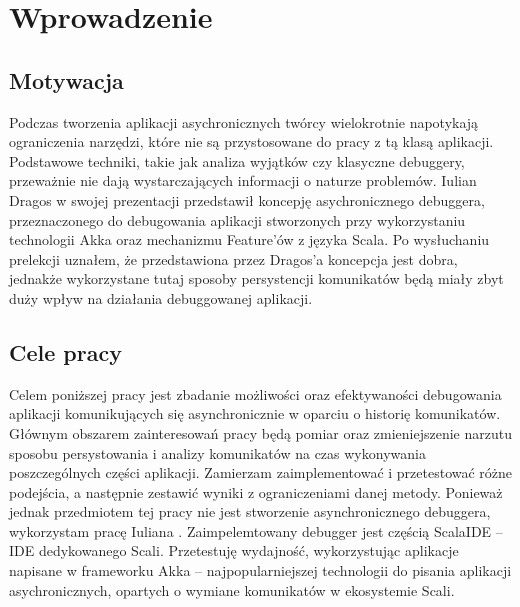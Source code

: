 \chapter{Wprowadzenie}


\section{Motywacja}

Podczas tworzenia aplikacji asychronicznych twórcy wielokrotnie napotykają ograniczenia narzędzi, które nie są przystosowane do pracy z tą klasą aplikacji. Podstawowe techniki, takie jak analiza wyjątków czy klasyczne debuggery, przeważnie nie dają wystarczających informacji o naturze problemów. Iulian Dragos w swojej prezentacji \cite{rethingningDebugger} przedstawił koncepję asychronicznego debuggera, przeznaczonego do debugowania aplikacji stworzonych przy wykorzystaniu technologii Akka oraz mechanizmu Feature'ów z języka Scala. Po wysłuchaniu prelekcji uznałem, że przedstawiona przez Dragos'a koncepcja jest dobra, jednakże wykorzystane tutaj sposoby persystencji komunikatów będą miały zbyt duży wpływ na działania debuggowanej aplikacji.



\section{Cele pracy}


Celem poniższej pracy jest zbadanie możliwości oraz efektywaności debugowania aplikacji komunikujących się asynchronicznie w oparciu o historię komunikatów. Głównym obszarem zainteresowań pracy będą pomiar oraz zmieniejszenie narzutu sposobu persystowania i analizy komunikatów na czas wykonywania poszczególnych części aplikacji. Zamierzam zaimplementować i przetestować różne podejścia, a następnie zestawić wyniki z ograniczeniami danej metody. Ponieważ jednak przedmiotem tej pracy nie jest stworzenie asynchronicznego debuggera, wykorzystam pracę Iuliana \cite{asychDebuggerGh}. Zaimpelemtowany debugger jest częścią ScalaIDE – IDE dedykowanego Scali. Przetestuję wydajność, wykorzystując aplikacje napisane w frameworku Akka – najpopularniejszej technologii do pisania aplikacji asychronicznych, opartych o wymiane komunikatów w ekosystemie Scali.













